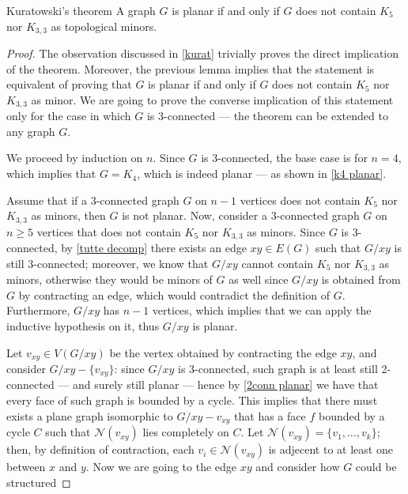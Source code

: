 \documentclass[a4paper, 12pt]{report}
\begin{document}
    \begin{framedthm}{Kuratowski's theorem}
        A graph $G$ is planar if and only if $G$ does not contain $K_5$ nor $K_{3,3}$ as topological minors.
    \end{framedthm}
    
    \begin{proof}
        The observation discussed in \cref{kurat} trivially proves the direct implication of the theorem. Moreover, the previous lemma implies that the statement is equivalent of proving that $G$ is planar if and only if $G$ does not contain $K_5$ nor $K_{3,3}$ as minor. We are going to prove the converse implication of this statement only for the case in which $G$ is 3-connected --- the theorem can be extended to any graph $G$.

        We proceed by induction on $n$. Since $G$ is 3-connected, the base case is for $n = 4$, which implies that $G = K_4$, which is indeed planar --- as shown in \cref{k4 planar}.

        Assume that if a 3-connected graph $G$ on $n - 1$ vertices does not contain $K_5$ nor $K_{3,3}$ as minors, then $G$ is not planar. Now, consider a 3-connected graph $G$ on $n \ge 5$ vertices that does not contain $K_5$ nor $K_{3,3}$ as minors. Since $G$ is 3-connected, by \cref{tutte decomp} there exists an edge $xy \in E(G)$ such that $G/xy$ is still 3-connected; moreover, we know that $G/xy$ cannot contain $K_5$ nor $K_{3,3}$ as minors, otherwise they would be minors of $G$ as well since $G/xy$ is obtained from $G$ by contracting an edge, which would contradict the definition of $G$. Furthermore, $G/xy$ has $n - 1$ vertices, which implies that we can apply the inductive hypothesis on it, thus $G/xy$ is planar.

        Let $v_{xy} \in V(G/xy)$ be the vertex obtained by contracting the edge $xy$, and consider $G/xy - \{v_{xy}\}$: since $G/xy$ is 3-connected, such graph is at least still 2-connected --- and surely still planar --- hence by \cref{2conn planar} we have that every face of such graph is bounded by a cycle. This implies that there must exists a plane graph isomorphic to $G/xy - v_{xy}$ that has a face $f$ bounded by a cycle $C$ such that $\mathcal N(v_{xy})$ lies completely on $C$. Let $\mathcal N (v_{xy}) = \{v_1, \ldots, v_k\}$; then, by definition of contraction, each $v_i \in \mathcal N(v_{xy})$ is adjecent to at least one between $x$ and $y$. Now we are going to  the edge $xy$ and consider how $G$ could be structured


\end{proof}
\end{document}
